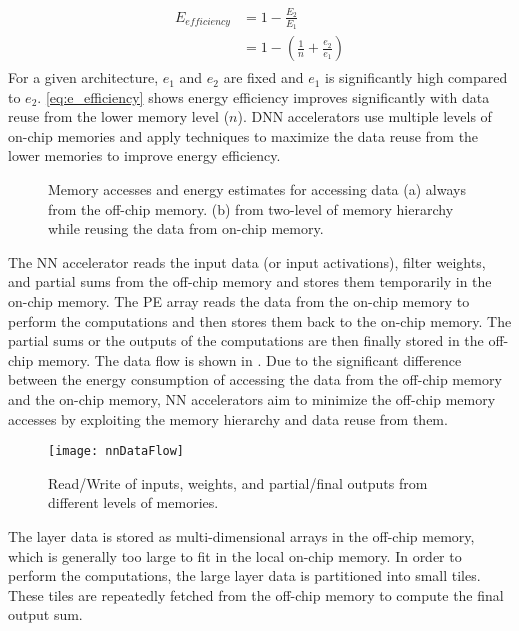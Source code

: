 \begin{align}\label{eq:e_efficiency}
	\begin{split}
	E_{efficiency}&=1-\frac{E_2}{E_1}\\
	&=1-(\frac{1}{n}+\frac{e_{2}}{e_{1}})
	\end{split}
\end{align}
For a given architecture, $e_{1}$ and $e_{2}$ are fixed and $e_1$ is significantly high compared to $e_2$. \eqref{eq:e_efficiency} shows energy efficiency improves significantly with data reuse from the lower memory level ($n$). DNN accelerators use multiple levels of on-chip memories and apply techniques to maximize the data reuse from the lower memories to improve energy efficiency. 
\begin{figure}[!htb]
	\centering
	\captionsetup{font=sf}
	\hfil	
	\hfil	
	\caption{Memory accesses and energy estimates for accessing data (a) always from the off-chip memory. (b) from two-level of memory hierarchy while reusing the data from on-chip memory.}
	\label{fig:memsAccess}
\end{figure}

The NN accelerator reads the input data (or input activations), filter weights, and partial sums from the off-chip memory and stores them temporarily in the on-chip memory. The PE array reads the data from the on-chip memory to perform the computations and then stores them back to the on-chip memory. The partial sums or the outputs of the computations are then finally stored in the off-chip memory. The data flow is shown in . Due to the significant difference between the energy consumption of accessing the data from the off-chip memory and the on-chip memory, NN accelerators aim to minimize the off-chip memory accesses by exploiting the memory hierarchy and data reuse from them.
\begin{figure}[!htb]
	\centering
	\captionsetup{font=sf}	
	\texttt{[image: nnDataFlow]}
	\caption{Read/Write of inputs, weights, and partial/final outputs from different levels of memories.}
	\label{fig:nnDataFlow}
\end{figure}

The layer data is stored as multi-dimensional arrays in the off-chip memory, which is generally too large to fit in the local on-chip memory. In order to perform the computations, the large layer data is partitioned into small tiles. These tiles are repeatedly fetched from the off-chip memory to compute the final output sum. 

